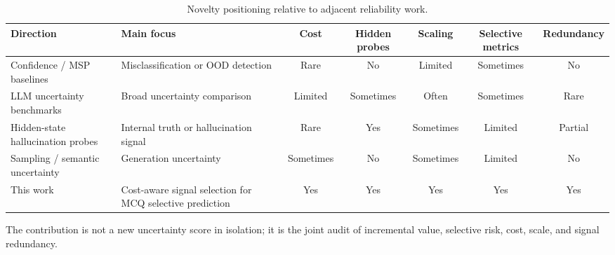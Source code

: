 \begin{table}[t]
\centering
\small
\caption{Novelty positioning relative to adjacent reliability work.}
\label{tab:novelty}
\begin{threeparttable}

\begin{adjustbox}{width=\textwidth}
\begin{tabular}{p{}p{}ccccc}
\toprule
Direction & Main focus & Cost & Hidden probes & Scaling & Selective metrics & Redundancy \\
\midrule
Confidence / MSP baselines & Misclassification or OOD detection & Rare & No & Limited & Sometimes & No \\
LLM uncertainty benchmarks & Broad uncertainty comparison & Limited & Sometimes & Often & Sometimes & Rare \\
Hidden-state hallucination probes & Internal truth or hallucination signal & Rare & Yes & Sometimes & Limited & Partial \\
Sampling / semantic uncertainty & Generation uncertainty & Sometimes & No & Sometimes & Limited & No \\
This work & Cost-aware signal selection for MCQ selective prediction & Yes & Yes & Yes & Yes & Yes \\
\bottomrule
\end{tabular}
\end{adjustbox}

\begin{tablenotes}[flushleft]\footnotesize\item \parbox{0.95\textwidth}{The contribution is not a new uncertainty score in isolation; it is the joint audit of incremental value, selective risk, cost, scale, and signal redundancy.}\end{tablenotes}
\end{threeparttable}
\end{table}

